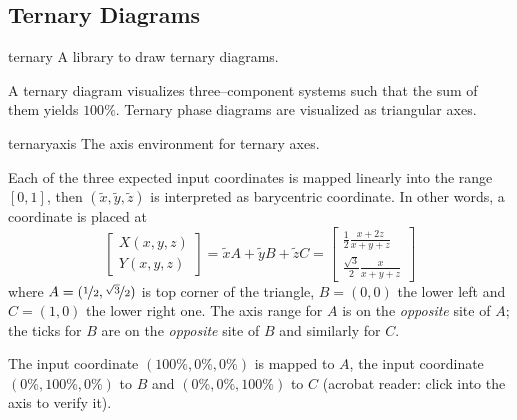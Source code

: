 \subsection{Ternary Diagrams}

\begin{pgfplotslibrary}{ternary}
	A library to draw ternary diagrams.

	A ternary diagram visualizes three--component systems such that the sum of them yields $100\%$. Ternary phase diagrams are visualized as triangular axes.
\end{pgfplotslibrary}


\begin{environment}{{ternaryaxis}}
	The axis environment for ternary axes.


\begin{codeexample}[]
\end{codeexample}

	Each of the three expected input coordinates is mapped linearly into the range $[0,1]$, then $(\tilde x,\tilde y,\tilde z)$ is interpreted as barycentric coordinate. In other words, a coordinate is placed at
	\[ 
		\begin{bmatrix}
			X(x,y,z)\\
			Y(x,y,z)
		\end{bmatrix}
		=
		\tilde x A + \tilde y B + \tilde z C
		= 
		\begin{bmatrix}
			\frac12 \frac{x+2z}{x+y+z}\\
			\frac{\sqrt 3}{2} \frac{x}{x+y+z}
		\end{bmatrix}
	\]
	where $A=(\nicefrac12,\nicefrac{\sqrt3}{2})$ is top corner of the triangle, $B=(0,0)$ the lower left and $C=(1,0)$ the lower right one. The axis range for $A$ is on the \emph{opposite} site of $A$; the ticks for $B$ are on the \emph{opposite} site of $B$ and similarly for $C$.

	The input coordinate $(100\%,0\%,0\%)$ is mapped to $A$, the input coordinate $(0\%,100\%,0\%)$ to $B$ and $(0\%,0\%,100\%)$ to $C$ (acrobat reader: click into the axis to verify it).


\end{environment}
